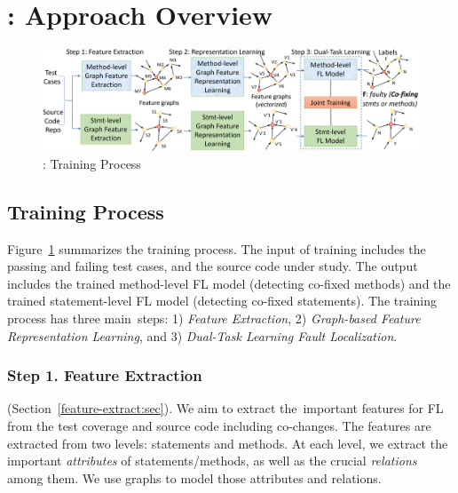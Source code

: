 \section{{\tool}: Approach Overview}
\label{overview:sec}

\begin{figure}[t]
	\centering
	\includegraphics[width=5.65in]{graphs/overview-training-4.png} %
        \vspace{-6pt}
	\caption{{\tool}: Training Process}
        \label{train-overview}
\end{figure}



\subsection{Training Process}


Figure~\ref{train-overview} summarizes the training process.
%
The input of training includes the passing and failing test cases, and
the source code under study.
The output includes the trained method-level FL model (detecting
co-fixed methods) and the trained statement-level FL model (detecting
co-fixed statements). The training process has three main~steps: 1)
{\em Feature Extraction}, 2) {\em Graph-based Feature Representation
  Learning}, and 3) {\em Dual-Task Learning Fault Localization}.




\subsubsection{Step 1. Feature Extraction}

(Section~\ref{feature-extract:sec}). We aim to extract the~important
features for FL from the test coverage and source code including
co-changes. The features are extracted from two levels: statements and
methods. At each level, we extract the important {\em attributes} of
statements/methods, as well as the crucial {\em relations} among
them. We use graphs to model those attributes and relations.

